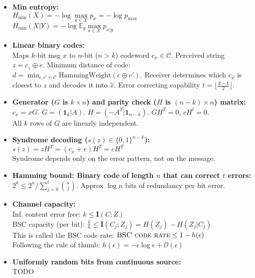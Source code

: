 \documentclass[twocolumn,9pt]{extarticle}
\begin{document}
\begin{itemize}
	\item \textbf{Min entropy: } \\
	$H_{\text{min}}(X) = -\log \max\limits_{x \in \mathcal{X}} p_x = -\log p_{\text{max}}$\\
	$H_{\text{min}}(X|Y) = -\log \mathbb{E}_y \max\limits_{x \in \mathcal{X}} p_{x|y}$

	\item \textbf{Linear binary codes: } \\
	Maps $k$-bit msg $x$ to $n$-bit ($n > k$) codeword $c_x \in \mathcal{C}$. Perceived string $z = c_z \oplus e$. Minimum distance of code: $d = \min_{c,c'\in\mathcal{C}} \text{HammingWeight}(c \oplus c')$. Receiver determines which $c_{\hat{x}}$ is closest to $z$ and decodes it into $\hat{x}$. Error correcting capability $t = \lfloor\frac{d-1}{2}\rfloor$.

	\item \textbf{Generator ($G$ is $k \times n$) and parity check ($H$ is $(n-k) \times n$) matrix: } \\
	$c_x = xG$. $G = (\mathbf{1}_k|A)$. $H = (-A^T|\mathbf{1}_{n-k})$. $GH^T= 0$, $cH^t=0$.\\
	All $k$ rows of $G$ are linearly independent.

	\item \textbf{Syndrome decoding ($s(z) \in \{0,1\}^{n-k}$):} \\
	$s(z) = zH^T = (c_x + e)H^T = eH^T$\\
	Syndrome depends only on the error pattern, not on the message.

	\item \textbf{Hamming bound: Binary code of length $n$ that can correct $t$ errors: } \\
	$2^k \leq 2^n / \sum_{j=0}^t \binom nj$. Approx $\log n$ bits of redundancy per bit error.

	\item \textbf{Channel capacity:} \\
	Inf. content error free: $k \leq \mathbf{I}(C;Z)$\\
	BSC capacity (per bit): $\frac{k}{n} \leq \mathbf{I}(C_j;Z_j) = H(Z_j) - H(Z_j|C_j)$ \\
	This is called the BSC code rate: $\textsc{BSC code rate} \leq 1 - h(\epsilon)$ \\
	Following the rule of thumb: $h(\epsilon) = -\epsilon \log \epsilon + \mathcal{O}(\epsilon)$

	\item \textbf{Uniformly random bits from continuous source:} \\
	TODO


\end{itemize}
\end{document}
